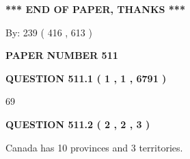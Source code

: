 \documentclass[12pt]{article}
\begin{document}
 
 
 
   
   
 \vspace{0.2in}
 
   
   
   
   
\vspace{1.0in} 
{\textbf{\large{ *** END OF PAPER, THANKS *** }}} 
   
   
\hspace{1.0in} By: 
 239 ( 416 ,  613 )
   
   
   
   
\newpage 
\setcounter{page}{ 
   511001 } 
   
   
   
   
 {\textbf{ \Large{ PAPER NUMBER  511  }}}
   
   
\vspace{0.2in}
   
   
   
   
   
   
 \vspace{0.2in}
 
 
 
 
   
   
  
\vspace{0.2in}
  
{\textbf{\Large{QUESTION
511.1 
 ( 1 , 1 , 6791 )
}}}
  
  
 
 
\noindent{}

69
 
 
  
\vspace{0.2in}
  
{\textbf{\Large{QUESTION
511.2 
 ( 2 , 2 , 3 )
}}}
  
  
 
 
\noindent{}
 
 
Canada has 10  provinces and 3 territories.
 
 
 
 
   
   
 \vspace{0.2in}
 
   
   
\end{document}
